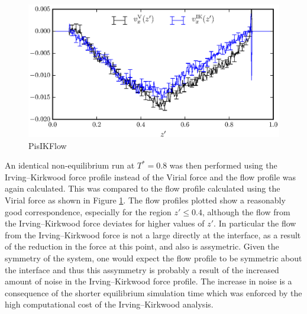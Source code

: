 \begin{figure}[h]
\centering
\includegraphics[scale=0.8]{PisIKFlow}
\caption{PisIKFlow}
\label{PisIKFlow}
\end{figure}
An identical non-equilibrium run at $T^{*} = 0.8$ was then performed using the Irving--Kirkwood force profile instead of the Virial force and the flow profile was again calculated.
This was compared to the flow profile calculated using the Virial force as shown in Figure \ref{PisIKFlow}.
The flow profiles plotted show a reasonably good correspondence, especially for the region $z' \leq 0.4$, although the flow from the Irving--Kirkwood force deviates for higher values of $z'$.
In particular the flow from the Irving--Kirkwood force is not a large directly at the interface, as a result of the reduction in the force at this point, and also is assymetric.
Given the symmetry of the system, one would expect the flow profile to be symmetric about the interface and thus this assymmetry is probably a result of the increased amount of noise in the Irving--Kirkwood force profile.
The increase in noise is a consequence of the shorter equilibrium simulation time which was enforced by the high computational cost of the Irving--Kirkwood analysis.








